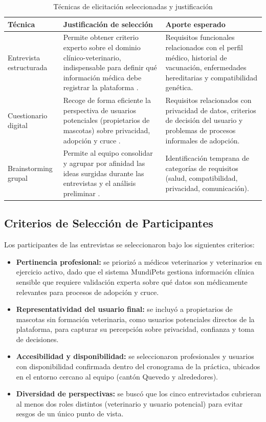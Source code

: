 \begin{table}[H]
	\centering
	\caption{Técnicas de elicitación seleccionadas y justificación}
	\label{tab:tecnicas_elicitacion}
	\begin{tabular}{|p{3cm}|p{6.2cm}|p{4.3cm}|}
		\hline
		\textbf{Técnica} & \textbf{Justificación de selección} & \textbf{Aporte esperado} \\ \hline
		Entrevista estructurada & Permite obtener criterio experto sobre el dominio clínico-veterinario, indispensable para definir qué información médica debe registrar la plataforma \cite{pohl2025}. & Requisitos funcionales relacionados con el perfil médico, historial de vacunación, enfermedades hereditarias y compatibilidad genética. \\ \hline
		Cuestionario digital & Recoge de forma eficiente la perspectiva de usuarios potenciales (propietarios de mascotas) sobre privacidad, adopción y cruce \cite{ireb2024}. & Requisitos relacionados con privacidad de datos, criterios de decisión del usuario y problemas de procesos informales de adopción. \\ \hline
		Brainstorming grupal & Permite al equipo consolidar y agrupar por afinidad las ideas surgidas durante las entrevistas y el análisis preliminar \cite{pohl2025}. & Identificación temprana de categorías de requisitos (salud, compatibilidad, privacidad, comunicación). \\ \hline
	\end{tabular}
\end{table}

\subsection{Criterios de Selección de Participantes}

Los participantes de las entrevistas se seleccionaron bajo los siguientes criterios:

\begin{itemize}[leftmargin=*]
	\item \textbf{Pertinencia profesional:} se priorizó a médicos veterinarios y veterinarios en ejercicio activo, dado que el sistema MundiPets gestiona información clínica sensible que requiere validación experta sobre qué datos son médicamente relevantes para procesos de adopción y cruce.
	\item \textbf{Representatividad del usuario final:} se incluyó a propietarios de mascotas sin formación veterinaria, como usuarios potenciales directos de la plataforma, para capturar su percepción sobre privacidad, confianza y toma de decisiones.
	\item \textbf{Accesibilidad y disponibilidad:} se seleccionaron profesionales y usuarios con disponibilidad confirmada dentro del cronograma de la práctica, ubicados en el entorno cercano al equipo (cantón Quevedo y alrededores).
	\item \textbf{Diversidad de perspectivas:} se buscó que los cinco entrevistados cubrieran al menos dos roles distintos (veterinario y usuario potencial) para evitar sesgos de un único punto de vista.
\end{itemize}

